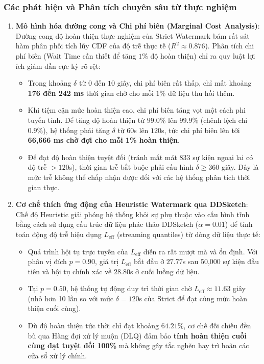 \documentclass[12pt,a4paper]{article}
\begin{document}
\subsubsection{Các phát hiện và Phân tích chuyên sâu từ thực nghiệm}
\begin{enumerate}
    \item \textbf{Mô hình hóa đường cong và Chi phí biên (Marginal Cost Analysis)}:
    Đường cong độ hoàn thiện thực nghiệm của Strict Watermark bám rất sát hàm phân phối tích lũy CDF của độ trễ thực tế ($R^2 \approx 0.876$). Phân tích chi phí biên (Wait Time cần thiết để tăng $1\%$ độ hoàn thiện) chỉ ra quy luật lợi ích giảm dần cực kỳ rõ rệt:
    \begin{itemize}
        \item Trong khoảng $\delta$ từ $0$ đến $10$ giây, chi phí biên rất thấp, chỉ mất khoảng \textbf{176 đến 242 ms} thời gian chờ cho mỗi $1\%$ dữ liệu thu hồi thêm.
        \item Khi tiệm cận mức hoàn thiện cao, chi phí biên tăng vọt một cách phi tuyến tính. Để tăng độ hoàn thiện từ $99.0\%$ lên $99.9\%$ (chênh lệch chỉ $0.9\%$), hệ thống phải tăng $\delta$ từ $60$s lên $120$s, tức chi phí biên lên tới \textbf{66,666 ms chờ đợi cho mỗi 1\% hoàn thiện}.
        \item Để đạt độ hoàn thiện tuyệt đối (tránh mất mát 833 sự kiện ngoại lai có độ trễ $>120$s), thời gian trễ bắt buộc phải cấu hình $\delta \ge 360$ giây. Đây là mức trễ không thể chấp nhận được đối với các hệ thống phân tích thời gian thực.
    \end{itemize}

    \item \textbf{Cơ chế thích ứng động của Heuristic Watermark qua DDSketch}:
    Chế độ Heuristic giải phóng hệ thống khỏi sự phụ thuộc vào cấu hình tĩnh bằng cách sử dụng cấu trúc dữ liệu phác thảo DDSketch ($\alpha = 0.01$) để tính toán động độ trễ hiệu dụng $L_{\text{eff}}$ (streaming quantiles) từ dòng dữ liệu thực tế:
    \begin{itemize}
        \item Quá trình hội tụ trực tuyến của $L_{\text{eff}}$ diễn ra rất mượt mà và ổn định. Với phân vị đích $p = 0.90$, giá trị $L_{\text{eff}}$ bắt đầu ở $27.77$s sau 50,000 sự kiện đầu tiên và hội tụ chính xác về $28.80$s ở cuối luồng dữ liệu.
        \item Tại $p = 0.50$, hệ thống tự động duy trì thời gian chờ $L_{\text{eff}} \approx 11.63$ giây (nhỏ hơn 10 lần so với mức $\delta = 120$s của Strict để đạt cùng mức hoàn thiện cuối cùng).
        \item Dù độ hoàn thiện tức thời chỉ đạt khoảng $64.21\%$, cơ chế đối chiếu đền bù qua Hàng đợi xử lý muộn (DLQ) đảm bảo \textbf{tính hoàn thiện cuối cùng đạt tuyệt đối 100\%} mà không gây tắc nghẽn hay trì hoãn các cửa sổ xử lý chính.
    \end{itemize}


\end{enumerate}
\end{document}
